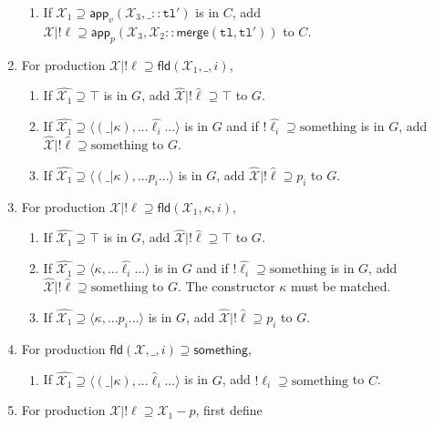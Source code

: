 \documentclass[a4paper]{article}
\newcommand*\vbar{|}
\begin{document}
\begin{enumerate}
\begin{enumerate}
        \item If $\mathcal{X_1}\supseteq\mathsf{app}_v(\mathcal{X}_3,\_::\mathtt{tl}')$ is in $C$, add $\mathcal{X}\vbar!\ell\supseteq\mathsf{app}_p(\mathcal{X}_3,\mathcal{X_2}::\mathsf{merge}(\mathtt{tl},\mathtt{tl}'))$ to $C$.
    \end{enumerate}
    \item For production $\mathcal{X}\vbar!\ell\supseteq\mathsf{fld}(\mathcal{X}_1,\_,i)$,
    \begin{enumerate}
        \item If $\hat{\mathcal{X}_1}\supseteq\top$ is in $G$, add $\hat{\mathcal{X}}\vbar!\hat{\ell}\supseteq\top$ to $G$.
        \item If $\hat{\mathcal{X}_1}\supseteq\langle(\_\vbar\kappa),...\hat{\ell_i}...\rangle$ is in $G$ and if $!\hat{\ell_i}\supseteq\text{something}$ is in $G$, add $\hat{\mathcal{X}}\vbar!\hat{\ell}\supseteq\text{something}$ to $G$.
        \item If $\hat{\mathcal{X}_1}\supseteq\langle(\_\vbar\kappa),...p_i...\rangle$ is in $G$, add $\hat{\mathcal{X}}\vbar!\hat{\ell}\supseteq p_i$ to $G$.
    \end{enumerate}    
    \item For production $\mathcal{X}\vbar!\ell\supseteq\mathsf{fld}(\mathcal{X}_1,\kappa,i)$,
    \begin{enumerate}
        \item If $\hat{\mathcal{X}_1}\supseteq\top$ is in $G$, add $\hat{\mathcal{X}}\vbar!\hat{\ell}\supseteq\top$ to $G$.
        \item If $\hat{\mathcal{X}_1}\supseteq\langle\kappa,...\hat{\ell_i}...\rangle$ is in $G$ and if $!\hat{\ell_i}\supseteq\text{something}$ is in $G$, add $\hat{\mathcal{X}}\vbar!\hat{\ell}\supseteq\text{something}$ to $G$. The constructor $\kappa$ must be matched.
        \item If $\hat{\mathcal{X}_1}\supseteq\langle\kappa,...p_i...\rangle$ is in $G$, add $\hat{\mathcal{X}}\vbar!\hat{\ell}\supseteq p_i$ to $G$.
    \end{enumerate}
    \item For production $\mathsf{fld}(\mathcal{X}, \_, i)\supseteq\mathsf{something}$,
    \begin{enumerate}
        \item If $\hat{\mathcal{X}_1}\supseteq\langle(\_\vbar\kappa),...\hat\ell_i...\rangle$ is in $G$, add $!\ell_i\supseteq\text{something}$ to $C$.
    \end{enumerate}
    \item For production $\mathcal{X}\vbar!\ell\supseteq\mathcal{X}_1-p$, first define

\end{enumerate}
\end{document}

